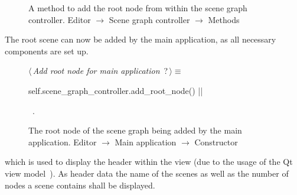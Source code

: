 \documentclass[%
    a4paper,    %
    justified,  %
    nobib,      %
    openany     %
]{tufte-book}
\makeatletter
\renewcommand{\label}[1]{\@tufte@label{##1}}%
\makeatother
\begin{document}
\begin{figure}
\begin{flushleft}
\begin{minipage}{\linewidth}
\begin{list}{}{\setlength{\itemsep}{-\parsep}\setlength{\itemindent}{-\leftmargin}}
\item{}
\end{list}
\end{minipage}\vspace{4ex}
\end{flushleft}
\caption{A method to add the root node from within the scene graph controller.
  \newline{}\newline{}Editor $\rightarrow$ Scene graph controller $\rightarrow$
  Methods}
\label{editor:lst:scene-graph-controller:methods:add-root-node}
\end{figure}

The root scene can now be added by the main application, as all necessary
components are set up.

\begin{figure}
\begin{flushleft} \small
\begin{minipage}{\linewidth}\label{scrap29}\raggedright\small
{} $\langle\,${\itshape Add root node for main application}\nobreak\ {\footnotesize {?}}$\,\rangle\equiv$
\vspace{-1ex}
\begin{pythoncode}
self.scene_graph_controller.add_root_node()
|\NWsep|
\end{pythoncode}
\vspace{1.5ex}
\footnotesize
\begin{list}{}{\setlength{\itemsep}{-\parsep}\setlength{\itemindent}{-\leftmargin}}
\item \NWtxtMacroRefIn\ .

\item{}
\end{list}
\end{minipage}\vspace{4ex}
\end{flushleft}
\caption{The root node of the scene graph being added by the main application.
  \newline{}\newline{}Editor $\rightarrow$ Main application $\rightarrow$
  Constructor}
\label{editor:lst:main-application:constructor:add-root-node}
\end{figure}

 which
is used to display the header within the view (due to the usage of the Qt view
model~). As header data the name of the
scenes as well as the number of nodes a scene contains shall be displayed.
\end{document}
